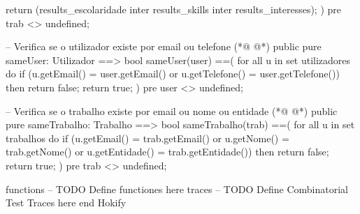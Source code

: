 \begin{vdmpp}[breaklines=true]
  return (results_escolaridade inter results_skills inter results_interesses);
 )
 pre trab <> undefined;
 
 -- Verifica se o utilizador existe por email ou telefone
(*@
\label{sameUser:207}
@*)
 public pure sameUser: Utilizador ==> bool
 sameUser(user) ==(
  for all u in set utilizadores do
   if (u.getEmail() = user.getEmail() or 
     u.getTelefone() = user.getTelefone()) then
    return false;
  return true;
 )
 pre user <> undefined;
 
 -- Verifica se o trabalho existe por email ou nome ou entidade
(*@
\label{sameTrabalho:218}
@*)
 public pure sameTrabalho: Trabalho ==> bool
 sameTrabalho(trab) ==(
  for all u in set trabalhos do
   if (u.getEmail() = trab.getEmail() or 
     u.getNome() = trab.getNome() or 
     u.getEntidade() = trab.getEntidade()) then
    return false;
  return true;
 )
 pre trab <> undefined;
 
functions
-- TODO Define functiones here
traces
-- TODO Define Combinatorial Test Traces here
end Hokify
\end{vdmpp}
\bigskip
